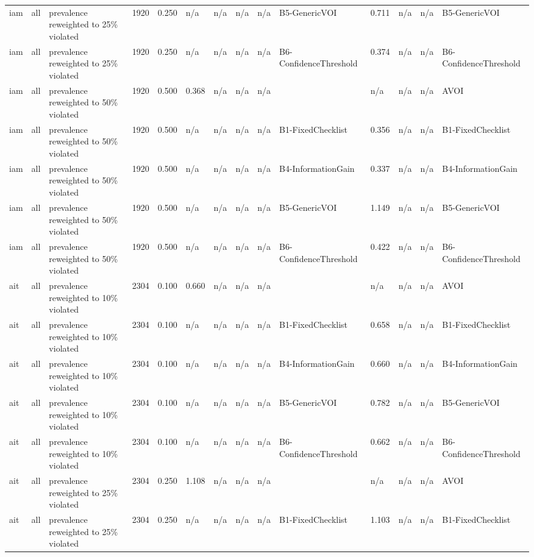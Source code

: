 \begin{table}[!ht]
{\begin{tabular}{llllllllllllll}
iam & all & prevalence reweighted to 25\% violated & 1920 & 0.250 & n/a & n/a & n/a & n/a & B5-GenericVOI & 0.711 & n/a & n/a & B5-GenericVOI \\
iam & all & prevalence reweighted to 25\% violated & 1920 & 0.250 & n/a & n/a & n/a & n/a & B6-ConfidenceThreshold & 0.374 & n/a & n/a & B6-ConfidenceThreshold \\
iam & all & prevalence reweighted to 50\% violated & 1920 & 0.500 & 0.368 & n/a & n/a & n/a &  & n/a & n/a & n/a & AVOI \\
iam & all & prevalence reweighted to 50\% violated & 1920 & 0.500 & n/a & n/a & n/a & n/a & B1-FixedChecklist & 0.356 & n/a & n/a & B1-FixedChecklist \\
iam & all & prevalence reweighted to 50\% violated & 1920 & 0.500 & n/a & n/a & n/a & n/a & B4-InformationGain & 0.337 & n/a & n/a & B4-InformationGain \\
iam & all & prevalence reweighted to 50\% violated & 1920 & 0.500 & n/a & n/a & n/a & n/a & B5-GenericVOI & 1.149 & n/a & n/a & B5-GenericVOI \\
iam & all & prevalence reweighted to 50\% violated & 1920 & 0.500 & n/a & n/a & n/a & n/a & B6-ConfidenceThreshold & 0.422 & n/a & n/a & B6-ConfidenceThreshold \\
ait & all & prevalence reweighted to 10\% violated & 2304 & 0.100 & 0.660 & n/a & n/a & n/a &  & n/a & n/a & n/a & AVOI \\
ait & all & prevalence reweighted to 10\% violated & 2304 & 0.100 & n/a & n/a & n/a & n/a & B1-FixedChecklist & 0.658 & n/a & n/a & B1-FixedChecklist \\
ait & all & prevalence reweighted to 10\% violated & 2304 & 0.100 & n/a & n/a & n/a & n/a & B4-InformationGain & 0.660 & n/a & n/a & B4-InformationGain \\
ait & all & prevalence reweighted to 10\% violated & 2304 & 0.100 & n/a & n/a & n/a & n/a & B5-GenericVOI & 0.782 & n/a & n/a & B5-GenericVOI \\
ait & all & prevalence reweighted to 10\% violated & 2304 & 0.100 & n/a & n/a & n/a & n/a & B6-ConfidenceThreshold & 0.662 & n/a & n/a & B6-ConfidenceThreshold \\
ait & all & prevalence reweighted to 25\% violated & 2304 & 0.250 & 1.108 & n/a & n/a & n/a &  & n/a & n/a & n/a & AVOI \\
ait & all & prevalence reweighted to 25\% violated & 2304 & 0.250 & n/a & n/a & n/a & n/a & B1-FixedChecklist & 1.103 & n/a & n/a & B1-FixedChecklist \\

\end{tabular}}
\end{table}
